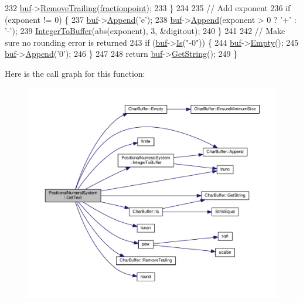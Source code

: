 \begin{DoxyCode}
232         \hyperlink{classNumeralSystem_a03e7be944bf3fa5e4c34d80f135cd017}{buf}->\hyperlink{classCharBuffer_a1071772d1059263f4f880965fcc349ab}{RemoveTrailing}(\hyperlink{classPositionalNumeralSystem_ad986e454b020c21e70f2efbc3682e44f}{fractionpoint});
233     \}
234 
235     \textcolor{comment}{// Add exponent}
236     \textcolor{keywordflow}{if} (exponent != 0) \{
237         \hyperlink{classNumeralSystem_a03e7be944bf3fa5e4c34d80f135cd017}{buf}->\hyperlink{classCharBuffer_a045b38735f7b3007c1b98d3d7b7feafe}{Append}(\textcolor{charliteral}{'e'});
238         \hyperlink{classNumeralSystem_a03e7be944bf3fa5e4c34d80f135cd017}{buf}->\hyperlink{classCharBuffer_a045b38735f7b3007c1b98d3d7b7feafe}{Append}(exponent > 0 ? \textcolor{charliteral}{'+'} : \textcolor{charliteral}{'-'});
239         \hyperlink{classPositionalNumeralSystem_ac2edd0c7d5b47dc04908038f3eb03556}{IntegerToBuffer}(abs(exponent), 3, &digitout);
240     \}
241 
242     \textcolor{comment}{// Make sure no rounding error is returned}
243     \textcolor{keywordflow}{if} (\hyperlink{classNumeralSystem_a03e7be944bf3fa5e4c34d80f135cd017}{buf}->\hyperlink{classCharBuffer_a64988275bda43dddb6d2b3b9551cefb0}{Is}(\textcolor{stringliteral}{"-0"})) \{
244         \hyperlink{classNumeralSystem_a03e7be944bf3fa5e4c34d80f135cd017}{buf}->\hyperlink{classCharBuffer_abe39d3fd7d8b9c8ec343af2cae7adc96}{Empty}();
245         \hyperlink{classNumeralSystem_a03e7be944bf3fa5e4c34d80f135cd017}{buf}->\hyperlink{classCharBuffer_a045b38735f7b3007c1b98d3d7b7feafe}{Append}(\textcolor{charliteral}{'0'});
246     \}
247 
248     \textcolor{keywordflow}{return} \hyperlink{classNumeralSystem_a03e7be944bf3fa5e4c34d80f135cd017}{buf}->\hyperlink{classCharBuffer_a7dfd3feaaf80f318ba44efe15b1ec44b}{GetString}();
249 \}
\end{DoxyCode}


Here is the call graph for this function\+:
\nopagebreak
\begin{figure}[H]
\begin{center}
\leavevmode
\includegraphics[width=350pt]{d6/ddc/classPositionalNumeralSystem_a2f6ecf8dd5ebff779bd2cba4e356febe_cgraph}
\end{center}
\end{figure}




